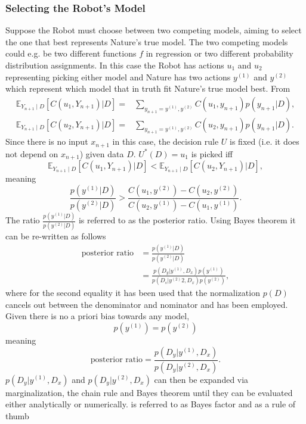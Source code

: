 \subsubsection{Selecting the Robot's Model}
\label{sec:model_selection}
Suppose the Robot must choose between two competing models, aiming to select the one that best represents Nature's true model. The two competing models could e.g. be two different functions $f$ in regression or two different probability distribution assignments. In this case the Robot has actions $u_1$ and $u_2$ representing picking either model and Nature has two actions $y^{(1)}$ and $y^{(2)}$ which represent which model that in truth fit Nature's true model best. From 
\begin{equation}
	\begin{split}
		\mathbb{E}_{Y_{n+1}\mid D}[C(u_1, Y_{n+1})|D] =&  \sum_{y_{n+1} = y^{(1)},y^{(2)}}C(u_1,y_{n+1})p(y_{n+1}|D),\\
		\mathbb{E}_{Y_{n+1}\mid D}[C(u_2, Y_{n+1})|D] =&  \sum_{y_{n+1} = y^{(1)},y^{(2)}}C(u_2,y_{n+1})p(y_{n+1}|D).
	\end{split}
\end{equation}
Since there is no input $x_{n+1}$ in this case, the decision rule $U$ is fixed (i.e. it does not depend on $x_{n+1}$) given data $D$. $U^*(D) = u_1$ is picked iff 
\begin{equation}
	\mathbb{E}_{Y_{n+1}\mid D}[C(u_1, Y_{n+1})|D]<\mathbb{E}_{Y_{n+1}\mid D}[C(u_2, Y_{n+1})|D],
\end{equation}
meaning
\begin{equation}
	\frac{p(y^{(1)}|D)}{p(y^{(2)}|D)}>\frac{C(u_1,y^{(2)})-C(u_2,y^{(2)})}{C(u_2,y^{(1)})-C(u_1,y^{(1)})}.
\end{equation}
The ratio $\frac{p(y^{(1)}|D)}{p(y^{(2)}|D)}$ is referred to as the posterior ratio. Using Bayes theorem it can be re-written as follows
\begin{equation}
	\begin{split}
		\text{posterior ratio} &= \frac{p(y^{(1)}|D)}{p(y^{(2)}|D)}\\
		& = \frac{p(D_y|y^{(1)},D_x)p(y^{(1)})}{p(D_s|y^{(2)}2,D_x)p(y^{(2)})},
	\end{split}
\end{equation}
where for the second equality it has been used that the normalization $p(D)$ cancels out between the denominator and nominator and  has been employed. Given there is no a priori bias towards any model,
\begin{equation}
	p(y^{(1)}) = p(y^{(2)})
\end{equation}
meaning
\begin{equation}
	\text{posterior ratio} = \frac{p(D_y|y^{(1)},D_x)}{p(D_y|y^{(2)},D_x)}.
	\label{eq:bayes_factor}
\end{equation}
$p(D_y|y^{(1)},D_x)$ and $p(D_y|y^{(2)},D_x)$ can then be expanded via marginalization, the chain rule and Bayes theorem until they can be evaluated either analytically or numerically.  is referred to as Bayes factor and as a rule of thumb

